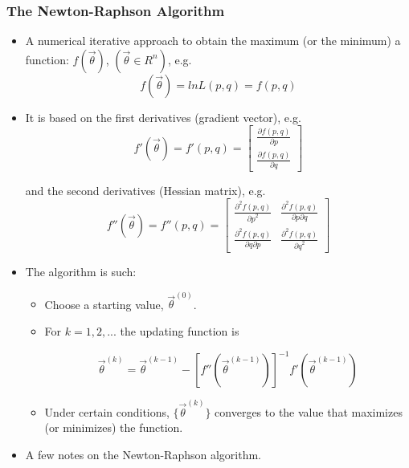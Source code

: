 \documentclass[10pt]{beamer}
\begin{document}
\begin{frame}
\frametitle{The Newton-Raphson Algorithm}
 
\begin{itemize}

\item A numerical iterative approach to obtain the maximum (or the minimum) a function: $f(\vec \theta)$, $(\vec \theta \in R^n)$, e.g.
$$f(\vec \theta) = lnL(p,q) = f(p,q)$$
\smallskip

\item It is based on the first derivatives (gradient vector), e.g.\\
 
\[ f'(\vec \theta) = f'(p,q) = 
\left[ \begin{array}{c} 
\frac{\partial{f(p,q)}}{\partial{p}}\\
\frac{\partial{f(p,q)}}{\partial{q}}
\end{array} \right] \]
\bigskip

and the second derivatives (Hessian matrix), e.g.\\

\[ f''(\vec \theta) = f''(p,q) = 
\left[ \begin{array}{cc} 
\frac{\partial^2 {f(p,q)}}{{\partial{p}}^2}&
\frac{\partial^2 {f(p,q)}}{\partial{p}\partial{q}}\\
\frac{\partial^2 {f(p,q)}}{\partial{q}\partial{p}}&
\frac{\partial^2 {f(p,q)}}{{\partial{q}}^2}
\end{array} \right] \]
\bigskip

\item The algorithm is such:

\begin{itemize}

\item Choose a starting value, $\vec \theta ^{(0)}$. 

\item For $k=1,2,...$ the updating function is

$$\vec \theta^{(k)} = \vec \theta^{(k-1)} 
- [f''(\vec \theta^{(k-1)})]^{-1} f'(\vec \theta^{(k-1)})$$  
\bigskip

\item Under certain conditions, $\{\vec \theta^{(k)}\}$ converges to the value that maximizes (or minimizes) the function. 
\end{itemize}
\pagebreak

\item A few notes on the Newton-Raphson algorithm. \\


\end{itemize}
\end{frame}
\end{document}
